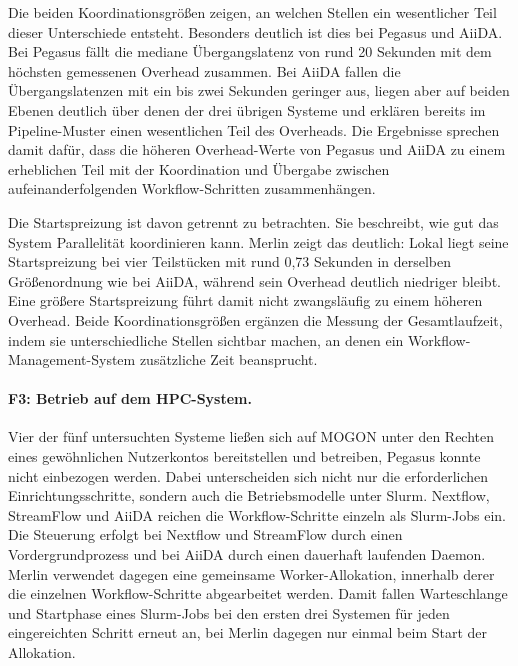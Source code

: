 Die beiden Koordinationsgrößen zeigen, an welchen Stellen ein
wesentlicher Teil dieser Unterschiede entsteht. Besonders deutlich ist dies bei Pegasus und AiiDA. Bei Pegasus fällt die mediane Übergangslatenz von rund 20 Sekunden mit dem höchsten gemessenen Overhead zusammen. Bei AiiDA fallen die Übergangslatenzen mit ein bis zwei Sekunden geringer aus, liegen aber auf beiden Ebenen deutlich über denen der drei übrigen Systeme und erklären bereits im Pipeline-Muster einen wesentlichen Teil des Overheads. Die Ergebnisse sprechen damit dafür, dass die höheren Overhead-Werte von Pegasus und AiiDA zu einem erheblichen Teil mit der Koordination und Übergabe
zwischen aufeinanderfolgenden Workflow-Schritten zusammenhängen.

Die Startspreizung ist davon getrennt zu betrachten. Sie beschreibt, wie gut das System Parallelität koordinieren kann. Merlin zeigt das deutlich: Lokal liegt seine
Startspreizung bei vier Teilstücken mit rund 0,73 Sekunden in
derselben Größenordnung wie bei AiiDA, während sein Overhead
deutlich niedriger bleibt. Eine größere Startspreizung führt damit
nicht zwangsläufig zu einem höheren Overhead. Beide
Koordinationsgrößen ergänzen die Messung der Gesamtlaufzeit, indem
sie unterschiedliche Stellen sichtbar machen, an denen ein
Workflow-Management-System zusätzliche Zeit beansprucht.

\paragraph{F3: Betrieb auf dem HPC-System.}
Vier der fünf untersuchten Systeme ließen sich auf MOGON unter den
Rechten eines gewöhnlichen Nutzerkontos bereitstellen und
betreiben, Pegasus konnte nicht einbezogen werden. Dabei
unterscheiden sich nicht nur die erforderlichen
Einrichtungsschritte, sondern auch die Betriebsmodelle unter Slurm.
Nextflow, StreamFlow und AiiDA reichen die Workflow-Schritte
einzeln als Slurm-Jobs ein. Die Steuerung erfolgt bei Nextflow und
StreamFlow durch einen Vordergrundprozess und bei AiiDA durch einen
dauerhaft laufenden Daemon. Merlin verwendet dagegen eine
gemeinsame Worker-Allokation, innerhalb derer die einzelnen
Workflow-Schritte abgearbeitet werden. Damit fallen Warteschlange
und Startphase eines Slurm-Jobs bei den ersten drei Systemen für
jeden eingereichten Schritt erneut an, bei Merlin dagegen nur
einmal beim Start der Allokation.

